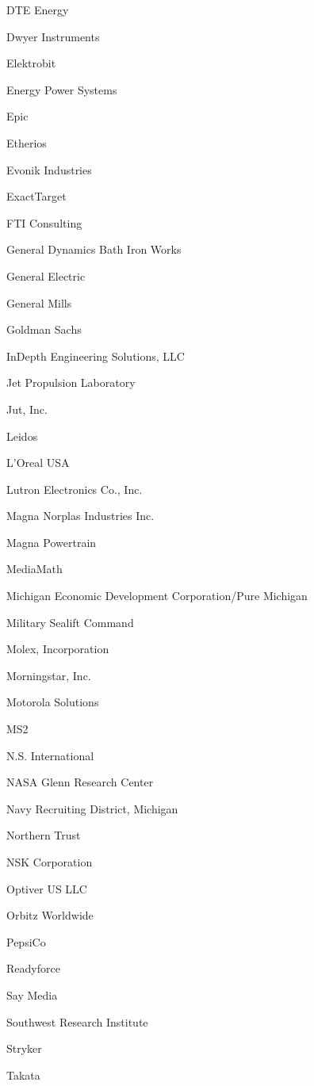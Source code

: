 \documentclass[twoside]{article}
\begin{document}
\begin{center}
\begin{multicols}{5}
\begin{FlushLeft}
\begin{compactitem}
\item DTE Energy
\item Dwyer Instruments
\item Elektrobit
\item Energy Power Systems
\item Epic
\item Etherios
\item Evonik Industries
\item ExactTarget
\item FTI Consulting
\item General Dynamics Bath Iron Works
\item General Electric
\item General Mills
\item Goldman Sachs
\item InDepth Engineering Solutions, LLC
\item Jet Propulsion Laboratory
\item Jut, Inc.
\item Leidos
\item L'Oreal USA
\item Lutron Electronics Co., Inc.
\item Magna Norplas Industries Inc.
\item Magna Powertrain
\item MediaMath
\item Michigan Economic Development Corporation/Pure Michigan
\item Military Sealift Command
\item Molex, Incorporation
\item Morningstar, Inc.
\item Motorola Solutions
\item MS2
\item N.S. International
\item NASA Glenn Research Center
\item Navy Recruiting District, Michigan
\item Northern Trust
\item NSK Corporation
\item Optiver US LLC
\item Orbitz Worldwide
\item PepsiCo
\item Readyforce
\item Say Media
\item Southwest Research Institute
\item Stryker
\item Takata

\end{compactitem}
\end{FlushLeft}
\end{multicols}
\end{center}
\end{document}
